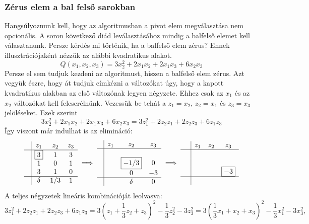 \documentclass[a4paper, showtrims]{memoir}
\theoremstyle{plain}
\theoremstyle{remark}
\theoremstyle{definition}
\begin{document}
\subsubsection{Zérus elem a bal felső sarokban}
Hangsúlyoznunk kell, hogy az algoritmusban a pivot elem megválasztása nem opcionális. 
A soron következő diád leválasztásához mindig a balfelső elemet kell választanunk.
Persze kérdés mi történik, ha a balfelső elem zérus?
Ennek illusztrációjaként nézzük az alábbi kvadratikus alakot.
\[
    Q\left( x_1,x_2,x_3 \right)=
    3x_2^2+
    2x_1x_2+2x_1x_3+
    6x_2x_3
\]
Persze el sem tudjuk kezdeni az algoritmust, hiszen a balfelső elem zérus.
Azt vegyük észre, hogy át tudjuk címkézni a változókat úgy, 
hogy a kapott kvadratikus alakban az első változónak legyen négyzete.
Ehhez csak az $x_1$ és az $x_2$ változókat kell felcserélnünk.
Vezessük be tehát a $z_1=x_2$, $z_2=x_1$ és $z_3=x_3$ jelöléseket.
Ezek szerint 
\[
    3x_2^2+
    2x_1x_2+2x_1x_3+
    6x_2x_3
    =
    3z_1^2+
    2z_2z_1+2z_2z_3+
    6z_1z_3
\]
Így viszont már indulhat is az elimináció:
\[
\begin{array}{c|ccc}
     & z_1       & z_2 & z_3 \\
     \hline
     & \boxed{3} & 1   & 3   \\
     & 1         & 0   & 1   \\
     & 3         & 1   & 0   \\
    \hline
    & \delta     & 1/3   & 1 
\end{array}
\implies
\begin{array}{c|ccc}
     & z_1& z_2  & z_3 \\
     \hline
     & &                &     \\
     & & \boxed{-1/3}      & 0   \\
     & & 0              & -3   \\
     \hline
     & & \delta         & 0
\end{array}
\implies
\begin{array}{c|ccc}
     & z_1 & z_2 & z_3      \\
     \hline
     &     &     &          \\
     &     &     &          \\
     &     &     & \boxed{-3}\\
    \hline
    \phantom{\delta}
\end{array}
\]
A teljes négyzetek lineáris kombinációját leolvasva:
\[
    3z_1^2+
    2z_2z_1+2z_2z_3+
    6z_1z_3
    =
    3\left( z_1+\frac{1}{3}z_2+z_3 \right)^2-\frac{1}{3}z_2^2-3z_3^2
    =
    3\left( \frac{1}{3}x_1+x_2+x_3 \right)^2-\frac{1}{3}x_1^2-3x_3^2,
\]
\end{document}
